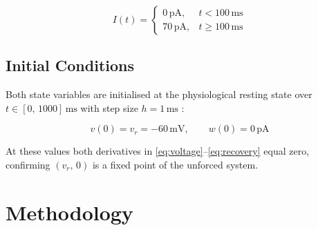 \documentclass[conference]{IEEEtran}
\begin{document}
\begin{equation}
  I(t) =
  \begin{cases}
    0\,\text{pA},  & t < 100\,\text{ms} \\
    70\,\text{pA}, & t \geq 100\,\text{ms}
  \end{cases}
  \label{eq:input}
\end{equation}

\begin{table}[htbp]
  \centering
  \caption{Input Current Schedule -- Eq.\,\eqref{eq:input}}
  \label{tab:input}
\end{table}

\subsection{Initial Conditions}

Both state variables are initialised at the physiological resting state over
$t \in [0,\,1000]\,\text{ms}$ with step size $h = 1\,\text{ms}$ \cite{schiesser}:

\begin{equation}
  v(0) = v_r = -60\,\text{mV}, \qquad w(0) = 0\,\text{pA}
  \label{eq:ic}
\end{equation}

At these values both derivatives in \eqref{eq:voltage}--\eqref{eq:recovery} equal zero,
confirming $(v_r,\,0)$ is a fixed point of the unforced system.

\section{Methodology}
\end{document}
